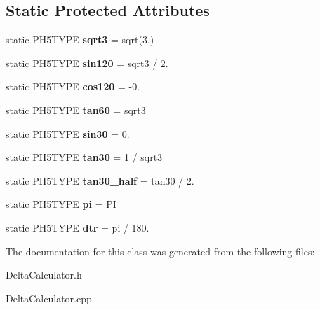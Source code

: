 \subsection*{Static Protected Attributes}
\begin{DoxyCompactItemize}
\item 
\hypertarget{classfirestep_1_1_delta_calculator_aa02e46f63bda2db477bfc9bf9b5bee51}{static P\+H5\+T\+Y\+P\+E {\bfseries sqrt3} = sqrt(3.)}\label{classfirestep_1_1_delta_calculator_aa02e46f63bda2db477bfc9bf9b5bee51}

\item 
\hypertarget{classfirestep_1_1_delta_calculator_a3de70b2c6e05a0257370b5fcbd02fac4}{static P\+H5\+T\+Y\+P\+E {\bfseries sin120} = sqrt3 / 2.}\label{classfirestep_1_1_delta_calculator_a3de70b2c6e05a0257370b5fcbd02fac4}

\item 
\hypertarget{classfirestep_1_1_delta_calculator_abe12f6b78c515d09f64d6abf612d51b5}{static P\+H5\+T\+Y\+P\+E {\bfseries cos120} = -\/0.}\label{classfirestep_1_1_delta_calculator_abe12f6b78c515d09f64d6abf612d51b5}

\item 
\hypertarget{classfirestep_1_1_delta_calculator_a9853e176f3a882a5669b5dd50b37bd18}{static P\+H5\+T\+Y\+P\+E {\bfseries tan60} = sqrt3}\label{classfirestep_1_1_delta_calculator_a9853e176f3a882a5669b5dd50b37bd18}

\item 
\hypertarget{classfirestep_1_1_delta_calculator_a996753f92f3b033a8a8c6cbe38f109a6}{static P\+H5\+T\+Y\+P\+E {\bfseries sin30} = 0.}\label{classfirestep_1_1_delta_calculator_a996753f92f3b033a8a8c6cbe38f109a6}

\item 
\hypertarget{classfirestep_1_1_delta_calculator_a3dd89f50ca3b809e7ef4296eb641a28b}{static P\+H5\+T\+Y\+P\+E {\bfseries tan30} = 1 / sqrt3}\label{classfirestep_1_1_delta_calculator_a3dd89f50ca3b809e7ef4296eb641a28b}

\item 
\hypertarget{classfirestep_1_1_delta_calculator_a3c837bef7d807891ad8a3658f9599ddb}{static P\+H5\+T\+Y\+P\+E {\bfseries tan30\+\_\+half} = tan30 / 2.}\label{classfirestep_1_1_delta_calculator_a3c837bef7d807891ad8a3658f9599ddb}

\item 
\hypertarget{classfirestep_1_1_delta_calculator_a67b5fd8e4d45f11cd49d294fe94894be}{static P\+H5\+T\+Y\+P\+E {\bfseries pi} = P\+I}\label{classfirestep_1_1_delta_calculator_a67b5fd8e4d45f11cd49d294fe94894be}

\item 
\hypertarget{classfirestep_1_1_delta_calculator_a958cc557513f77a2ff22acfe4860c62b}{static P\+H5\+T\+Y\+P\+E {\bfseries dtr} = pi / 180.}\label{classfirestep_1_1_delta_calculator_a958cc557513f77a2ff22acfe4860c62b}

\end{DoxyCompactItemize}


The documentation for this class was generated from the following files\+:\begin{DoxyCompactItemize}
\item 
Delta\+Calculator.\+h\item 
Delta\+Calculator.\+cpp\end{DoxyCompactItemize}
